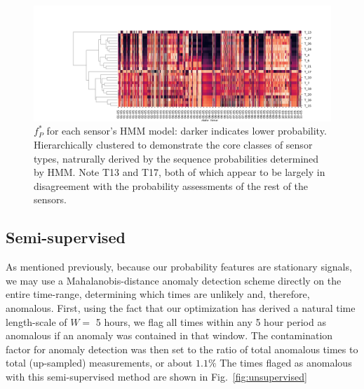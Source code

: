 \documentclass[twocolumn,10pt]{article}
\begin{document}
\begin{figure}
    \centering
    \includegraphics[width=\linewidth]{cluster_prob.png}
    \caption{$f^*_P$ for each sensor's HMM model: darker indicates lower probability. Hierarchically clustered to demonstrate the core classes of sensor types, natrurally derived by the sequence probabilities determined by HMM. Note T13 and T17, both of which appear to be largely in disagreement with the probability assessments of the rest of the sensors.  }
    \label{fig:my_label}
\end{figure}


\subsection{Semi-supervised}
As mentioned previously, because our probability features are stationary signals, we may use a Mahalanobis-distance anomaly detection scheme directly on the entire time-range, determining which times are unlikely and, therefore, anomalous. First, using the fact that our optimization has derived a natural time length-scale of $W=$ 5 hours, we flag all times within any 5 hour period as anomalous if an anomaly was contained in that window. The contamination factor for anomaly detection was then set to the ratio of total anomalous times to total (up-sampled) measurements, or about $1.1\%$ The times flaged as anomalous with this semi-supervised method are shown in Fig.~\ref{fig:unsupervised}
\end{document}
